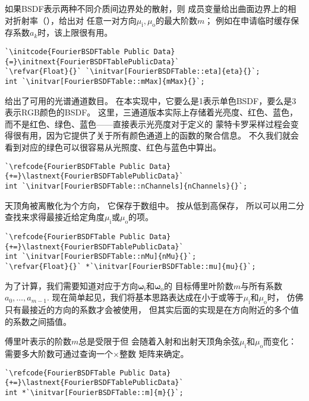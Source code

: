 如果BSDF表示两种不同介质间边界处的散射，则
成员变量给出曲面边界上的相对折射率（），给出对
任意一对方向$\mu_{\mathrm{i}},\mu_{\mathrm{o}}$的最大阶数$m$；
例如在申请临时缓存保存系数$a_k$时，该上限很有用。
\begin{lstlisting}
`\initcode{FourierBSDFTable Public Data}{=}\initnext{FourierBSDFTablePublicData}`
`\refvar{Float}{}` `\initvar[FourierBSDFTable::eta]{eta}{}`;
int `\initvar[FourierBSDFTable::mMax]{mMax}{}`;
\end{lstlisting}

给出了可用的光谱通道数目。
在本实现中，它要么是1表示单色BSDF，要么是3表示RGB颜色的BSDF。
这里，三通道版本实际上存储着光亮度、红色、蓝色，
而不是红色、绿色、蓝色——直接表示光亮度对于定义的
蒙特卡罗采样过程会变得很有用，因为它提供了关于所有颜色通道上的函数的聚合信息。
不久我们就会看到对应的绿色可以很容易从光照度、红色与蓝色中算出。
\begin{lstlisting}
`\refcode{FourierBSDFTable Public Data}{+=}\lastnext{FourierBSDFTablePublicData}`
int `\initvar[FourierBSDFTable::nChannels]{nChannels}{}`;
\end{lstlisting}

天顶角被离散化为个方向，
它保存于数组中。
按从低到高保存，
所以可以用二分查找来求得最接近给定角度$\mu_{\mathrm{i}}$或$\mu_{\mathrm{o}}$的项。
\begin{lstlisting}
`\refcode{FourierBSDFTable Public Data}{+=}\lastnext{FourierBSDFTablePublicData}`
int `\initvar[FourierBSDFTable::nMu]{nMu}{}`;
`\refvar{Float}{}` *`\initvar[FourierBSDFTable::mu]{mu}{}`;
\end{lstlisting}

为了计算，我们需要知道对应于方向${\bm\omega}_{\mathrm{i}}$和${\bm\omega}_{\mathrm{o}}$的
目标傅里叶阶数$m$与所有系数$a_0,\dots,a_{m-1}$.
现在简单起见，我们将基本思路表达成在小于或等于$\mu_{\mathrm{i}}$和$\mu_{\mathrm{o}}$时，
仿佛只有最接近的方向的系数才会被使用，
但其实后面的实现是在方向附近的多个值的系数之间插值。

傅里叶表示的阶数$m$总是受限于但
会随着入射和出射天顶角余弦$\mu_{\mathrm{i}}$和$\mu_{\mathrm{o}}$而变化：
需要多大阶数可通过查询一个$\times$整数
矩阵来确定。
\begin{lstlisting}
`\refcode{FourierBSDFTable Public Data}{+=}\lastnext{FourierBSDFTablePublicData}`
int *`\initvar[FourierBSDFTable::m]{m}{}`;
\end{lstlisting}

